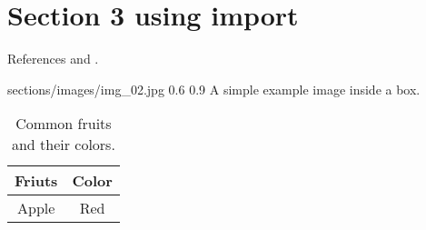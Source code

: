 
\section{Section 3 using import}
References \parencite{Ref01}  and \parencite{Ref02}.

\begin{centerBoxImageStyle}
    {sections/images/img_02.jpg}  
    {0.6\linewidth}                         
    {0.9\linewidth}                         
    {A simple example image inside a box.}  
    {}               
\end{centerBoxImageStyle}


\begin{table}[h!] %
    \centering
    \begin{tabular}{|c|c|}     \hline
        Friuts & Color          \\ \hline
        Apple & Red             \\ \hline
    \end{tabular}
    \caption{Common fruits and their colors.}
\end{table}


